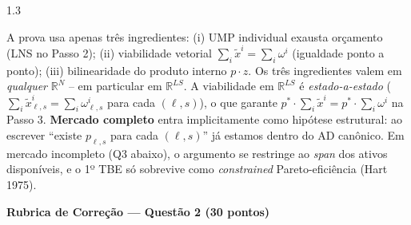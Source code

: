 \documentclass[11pt,addpoints]{exam}
\begin{document}
\begin{spacing}{1.3}
\begin{questions}
\begin{parts}
\begin{solution}
A prova usa apenas três ingredientes: (i) UMP individual exausta orçamento (LNS no Passo 2); (ii) viabilidade vetorial $\sum_i \tilde x^i = \sum_i \omega^i$ (igualdade ponto a ponto); (iii) bilinearidade do produto interno $p \cdot z$. Os três ingredientes valem em \emph{qualquer} $\mathbb{R}^N$ -- em particular em $\mathbb{R}^{LS}$. A viabilidade em $\mathbb{R}^{LS}$ é \emph{estado-a-estado} ($\sum_i \tilde x^i_{\ell, s} = \sum_i \omega^i_{\ell, s}$ para cada $(\ell, s)$), o que garante $p^* \cdot \sum_i \tilde x^i = p^* \cdot \sum_i \omega^i$ na Passo 3. \textbf{Mercado completo} entra implicitamente como hipótese estrutural: ao escrever ``existe $p_{\ell, s}$ para cada $(\ell, s)$'' já estamos dentro do AD canônico. Em mercado incompleto (Q3 abaixo), o argumento se restringe ao \emph{span} dos ativos disponíveis, e o 1º TBE só sobrevive como \emph{constrained} Pareto-eficiência (Hart 1975).
\end{solution}

\end{parts}

\ifprintanswers
\vspace{1em}
{\color{rubred}
\noindent\textbf{Rubrica de Correção --- Questão 2 (30 pontos)}
\vspace{0.3em}

}
\end{questions}
\end{spacing}
\end{document}
